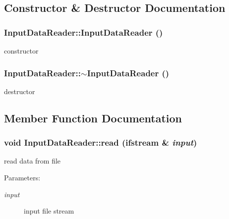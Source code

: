 \subsection{Constructor \& Destructor Documentation}
\subsubsection[InputDataReader]{\setlength{\rightskip}{0pt plus 5cm}InputDataReader::InputDataReader ()}\label{classInputDataReader_38a066c668e7e293c8aa4dd5aca0fb74}


constructor 

\subsubsection[$\sim$InputDataReader]{\setlength{\rightskip}{0pt plus 5cm}InputDataReader::$\sim$InputDataReader ()}\label{classInputDataReader_404f102d2fae6f7badb2414d6ead295f}


destructor 



\subsection{Member Function Documentation}
\subsubsection[read]{\setlength{\rightskip}{0pt plus 5cm}void InputDataReader::read (ifstream \& {\em input})}\label{classInputDataReader_07f0e518c523b08f5cff2f326d27ead3}


read data from file \begin{Desc}
\item[Parameters:]
\begin{description}
\item[{\em input}]input file stream \end{description}
\end{Desc}
